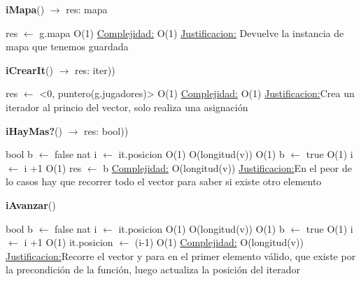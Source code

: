 \begin{Algoritmos}

\begin{algorithm}[H]{\textbf{iMapa}() $\to$ res: mapa}
	\begin{algorithmic}[1]
		\State res $\gets$ g.mapa \Comment O(1)
		\medskip
		\Statex \underline{Complejidad:} O(1)
		\Statex \underline{Justificacion:} Devuelve la instancia de mapa que tenemos guardada
	\end{algorithmic}
\end{algorithm}




\begin{algorithm}[H]{\textbf{iCrearIt}() $\to$ res: iter))}
	\begin{algorithmic}[1]
		\State res $\gets$ <0, puntero(g.jugadores)> \Comment O(1)
		\medskip
		\Statex \underline{Complejidad:} O(1)
		\Statex \underline{Justificacion:}Crea un iterador al princio del vector, solo 
		realiza una asignación  
	\end{algorithmic}
\end{algorithm}

\begin{algorithm}[H]{\textbf{iHayMas?}() $\to$ res: bool))}
	\begin{algorithmic}[1]
		\State bool b $\gets$ false
		\State nat i $\gets$ it.posicion \Comment O(1)
		 \Comment O(longitud(v))
			 \Comment O(1)
				\State b $\gets$ true \Comment O(1)
			\EndIf
		\State i $\gets$ i +1 \Comment O(1)		
		\EndWhile
		\State res $\gets$ b
		\medskip
		\Statex \underline{Complejidad:} O(longitud(v))
		\Statex \underline{Justificacion:}En el peor de lo casos hay que recorrer todo el vector para saber si existe otro elemento

\end{algorithmic}
\end{algorithm}	
		
\begin{algorithm}[H]{\textbf{iAvanzar}()}
	\begin{algorithmic}[1]
		\State bool b $\gets$ false
		\State nat i $\gets$ it.posicion \Comment O(1)
		 \Comment O(longitud(v))
			 \Comment O(1)
				\State b $\gets$ true \Comment O(1)
			\EndIf
		\State i $\gets$ i +1 \Comment O(1)		
		\EndWhile
		\State it.posicion $\gets$ (i-1) \Comment O(1)
		\medskip
		\Statex \underline{Complejidad:} O(longitud(v))
		\Statex \underline{Justificacion:}Recorre el vector y para en el primer elemento válido, que existe por la precondición de la función, luego actualiza la posición del iterador  
	\end{algorithmic}
\end{algorithm}


\end{Algoritmos}
